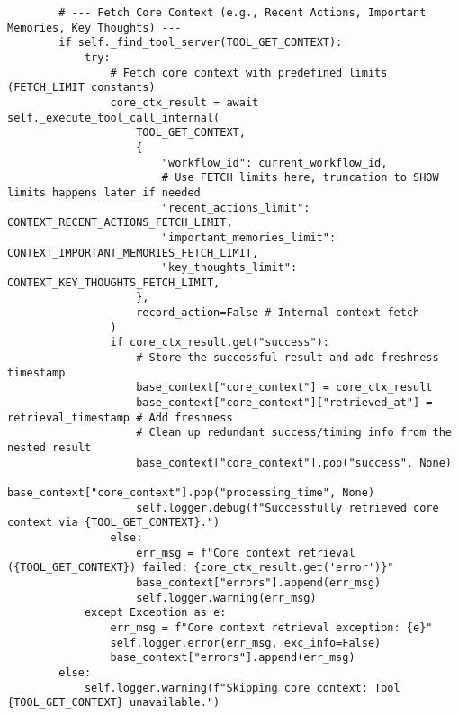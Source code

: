 \documentclass[12pt,a4paper]{article}
\begin{document}
\begin{pageablecode}
\begin{verbatim}
        # --- Fetch Core Context (e.g., Recent Actions, Important Memories, Key Thoughts) ---
        if self._find_tool_server(TOOL_GET_CONTEXT):
            try:
                # Fetch core context with predefined limits (FETCH_LIMIT constants)
                core_ctx_result = await self._execute_tool_call_internal(
                    TOOL_GET_CONTEXT,
                    {
                        "workflow_id": current_workflow_id,
                        # Use FETCH limits here, truncation to SHOW limits happens later if needed
                        "recent_actions_limit": CONTEXT_RECENT_ACTIONS_FETCH_LIMIT,
                        "important_memories_limit": CONTEXT_IMPORTANT_MEMORIES_FETCH_LIMIT,
                        "key_thoughts_limit": CONTEXT_KEY_THOUGHTS_FETCH_LIMIT,
                    },
                    record_action=False # Internal context fetch
                )
                if core_ctx_result.get("success"):
                    # Store the successful result and add freshness timestamp
                    base_context["core_context"] = core_ctx_result
                    base_context["core_context"]["retrieved_at"] = retrieval_timestamp # Add freshness
                    # Clean up redundant success/timing info from the nested result
                    base_context["core_context"].pop("success", None)
                    base_context["core_context"].pop("processing_time", None)
                    self.logger.debug(f"Successfully retrieved core context via {TOOL_GET_CONTEXT}.")
                else:
                    err_msg = f"Core context retrieval ({TOOL_GET_CONTEXT}) failed: {core_ctx_result.get('error')}"
                    base_context["errors"].append(err_msg)
                    self.logger.warning(err_msg)
            except Exception as e:
                err_msg = f"Core context retrieval exception: {e}"
                self.logger.error(err_msg, exc_info=False)
                base_context["errors"].append(err_msg)
        else:
            self.logger.warning(f"Skipping core context: Tool {TOOL_GET_CONTEXT} unavailable.")


\end{verbatim}
\end{pageablecode}
\end{document}

